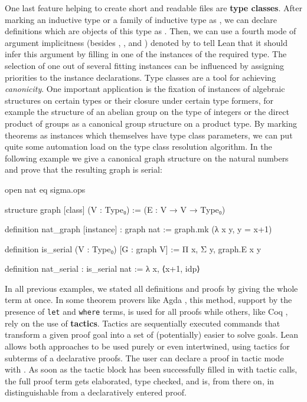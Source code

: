One last feature helping to create short and readable files are \textbf{type
class\-es}.
After marking an inductive type or a family of inductive type as \leani{[class]},
we can declare definitions which are objects of this type as \leani{[instance]}.
Then, we can use a fourth mode of argument implicitness (besides ,
, and ) denoted by \leani{[...]} to tell Lean that it
should infer this argument by filling in one of the instances of the required
type.
The selection of one out of several fitting instances can be influenced by assigning
priorities to the instance declarations.
Type classes are a tool for achieving \emph{canonicity}.
One important application is the fixation of instances of algebraic structures on
certain types or their closure under certain type formers, for example the structure
of an abelian group on the type of integers or the direct product of groups as
a canonical group structure on a product type.
By marking theorems as instances which themselves have type class parameters,
we can put quite some automation load on the type class resolution algorithm.
In the following example we give a canonical graph structure on the natural numbers
and prove that the resulting graph is serial:
\begin{leancode}
open nat eq sigma.ops

structure graph [class] (V : Type₀) := (E : V → V → Type₀)

definition nat_graph [instance] : graph nat := graph.mk (λ x y, y = x+1)

definition is_serial (V : Type₀) [G : graph V] := Π x, Σ y, graph.E x y

definition nat_serial : is_serial nat := λ x, ⟨x+1, idp⟩
\end{leancode}

In all previous examples, we stated all definitions and proofs by giving the
whole term at once.
In some theorem provers like Agda \cite{agda}, this method, support by the presence
of \texttt{let} and \texttt{where} terms, is used for all proofs while others,
like Coq \cite{coq}, rely on the use of \textbf{tactics}.
Tactics are sequentially executed commands that transform a given proof goal into
a set of (potentially) easier to solve goals.
Lean allows both approaches to be used purely or even intertwined, using tactics for subterms
of a declarative proofs.
The user can declare a proof in tactic mode with .
As soon as the tactic block has been successfully filled in with tactic calls,
the full proof term gets elaborated, type checked, and is, from there on, in\-
distinguishable from a declaratively entered proof.

